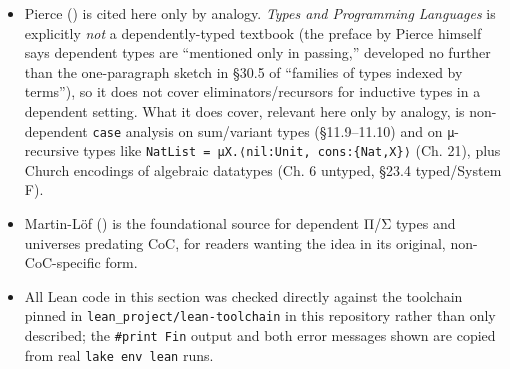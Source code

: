 \begin{itemize}
\item
  Pierce (\cite{Pierce2002}) is cited here only by analogy. \emph{Types and Programming Languages} is explicitly \emph{not} a dependently-typed textbook (the preface by Pierce himself says dependent types are ``mentioned only in passing,'' developed no further than the one-paragraph sketch in §30.5 of ``families of types indexed by terms''), so it does not cover eliminators/recursors for inductive types in a dependent setting. What it does cover, relevant here only by analogy, is non-dependent \texttt{case} analysis on sum/variant types (§11.9--11.10) and on \texttt{µ}-recursive types like \texttt{NatList = μX.⟨nil:Unit, cons:\{Nat,X\}⟩} (Ch. 21), plus Church encodings of algebraic datatypes (Ch. 6 untyped, §23.4 typed/System F).
\item
  Martin-Löf (\cite{MartinLof1984}) is the foundational source for dependent Π/Σ types and universes predating CoC, for readers wanting the idea in its original, non-CoC-specific form.
\item
  All Lean code in this section was checked directly against the toolchain pinned in \texttt{lean\_\allowbreak{}project/\allowbreak{}lean-\allowbreak{}toolchain} in this repository rather than only described; the \texttt{\#print Fin} output and both error messages shown are copied from real \texttt{lake env lean} runs.
\end{itemize}
